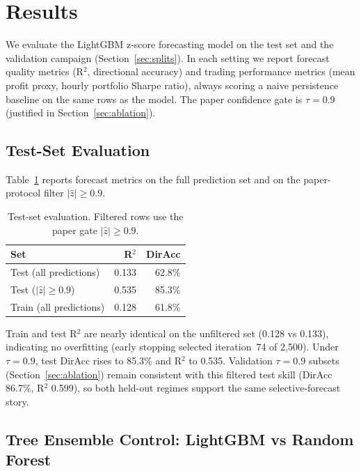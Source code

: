 \section{Results}\label{sec:results}

We evaluate the LightGBM z-score forecasting model on the test set and the validation campaign (Section~\ref{sec:splits}). In each setting we report forecast quality metrics (R$^2$, directional accuracy) and trading performance metrics (mean profit proxy, hourly portfolio Sharpe ratio), always scoring a naive persistence baseline on the same rows as the model. The paper confidence gate is $\tau{=}0.9$ (justified in Section~\ref{sec:ablation}).

\subsection{Test-Set Evaluation}

Table~\ref{tab:test} reports forecast metrics on the full prediction set and on the paper-protocol filter $|\hat{z}| \geq 0.9$.

\begin{table}[h]
\caption{Test-set evaluation. Filtered rows use the paper gate $|\hat{z}| \geq 0.9$.}
\label{tab:test}
\begin{tabular}{lrr}
\toprule
\textbf{Set} & \textbf{R$^2$} & \textbf{DirAcc} \\
\midrule
Test (all predictions)       & 0.133 & 62.8\% \\
Test ($|\hat{z}| \geq 0.9$) & 0.535 & 85.3\% \\
Train (all predictions)      & 0.128 & 61.8\% \\
\bottomrule
\end{tabular}
\end{table}

Train and test R$^2$ are nearly identical on the unfiltered set (0.128 vs 0.133), indicating no overfitting (early stopping selected iteration~74 of 2,500). Under $\tau{=}0.9$, test DirAcc rises to 85.3\% and R$^2$ to 0.535. Validation $\tau{=}0.9$ subsets (Section~\ref{sec:ablation}) remain consistent with this filtered test skill (DirAcc 86.7\%, R$^2$ 0.599), so both held-out regimes support the same selective-forecast story.

\subsection{Tree Ensemble Control: LightGBM vs Random Forest}

